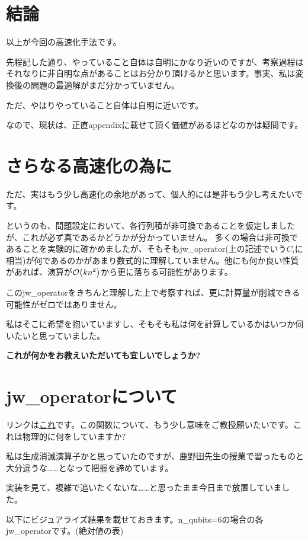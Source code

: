 \documentclass[a4paper, 10pt, dvipdfmx]{jlreq}
\begin{document}
\section{結論}

以上が今回の高速化手法です。

先程記した通り、やっていること自体は自明にかなり近いのですが、考察過程はそれなりに非自明な点があることはお分かり頂けるかと思います。事実、私は変換後の問題の最適解がまだ分かっていません。

ただ、やはりやっていること自体は自明に近いです。

なので、現状は、正直appendixに載せて頂く価値があるほどなのかは疑問です。

\section{さらなる高速化の為に}

ただ、実はもう少し高速化の余地があって、個人的には是非もう少し考えたいです。

というのも、問題設定において、各行列積が非可換であることを仮定しましたが、これが必ず真であるかどうかが分かっていません。
多くの場合は非可換であることを実験的に確かめましたが、そもそもjw\_operator(上の記述でいう$C_i$に相当)が何であるのかがあまり数式的に理解していません。他にも何か良い性質があれば、演算が$\order{kn^2}$から更に落ちる可能性があります。

このjw\_operatorをきちんと理解した上で考察すれば、更に計算量が削減できる可能性がゼロではありません。

私はそこに希望を抱いていますし、そもそも私は何を計算しているかはいつか伺いたいと思っていました。

\textbf{これが何かをお教えいただいても宜しいでしょうか?}

\section{jw\_operatorについて}

リンクは\href{https://quantumai.google/reference/python/openfermion/linalg/jordan_wigner_ladder_sparse}{これ}です。この関数について、もう少し意味をご教授願いたいです。これは物理的に何をしていますか?

私は生成消滅演算子かと思っていたのですが、鹿野田先生の授業で習ったものと大分違うな……となって把握を諦めています。

実装を見て、複雑で追いたくないな……と思ったまま今日まで放置していました。

以下にビジュアライズ結果を載せておきます。n\_qubits=6の場合の各jw\_operatorです。(絶対値の表)
\end{document}
